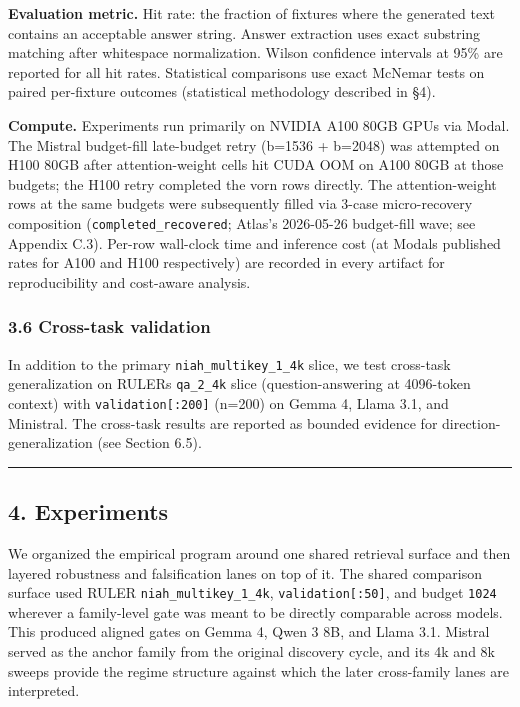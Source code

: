 \documentclass[
]{article}
\begin{document}
\textbf{Evaluation metric.} Hit rate: the fraction of fixtures where the
generated text contains an acceptable answer string. Answer extraction
uses exact substring matching after whitespace normalization. Wilson
confidence intervals at 95\% are reported for all hit rates. Statistical
comparisons use exact McNemar tests on paired per-fixture outcomes
(statistical methodology described in §4).

\textbf{Compute.} Experiments run primarily on NVIDIA A100 80GB GPUs via
Modal. The Mistral budget-fill late-budget retry (b=1536 +
b=2048) was attempted on H100 80GB after attention-weight cells hit CUDA
OOM on A100 80GB at those budgets; the H100 retry completed the vorn
rows directly. The attention-weight rows at the same budgets were
subsequently filled via 3-case micro-recovery composition
(\texttt{completed\_recovered}; Atlas's 2026-05-26 budget-fill wave;
see Appendix C.3). Per-row wall-clock
time and inference cost (at Modal\textquotesingle s published rates for
A100 and H100 respectively) are recorded in every artifact for
reproducibility and cost-aware analysis.

\subsubsection{3.6 Cross-task
validation}\label{36-cross-task-validation}

In addition to the primary \texttt{niah\_multikey\_1\_4k} slice, we test
cross-task generalization on RULER\textquotesingle s \texttt{qa\_2\_4k}
slice (question-answering at 4096-token context) with
\texttt{validation{[}:200{]}} (n=200) on Gemma 4, Llama 3.1, and
Ministral. The cross-task results are reported as bounded evidence
for direction-generalization (see Section 6.5).

\begin{center}\rule{0.5\linewidth}{0.5pt}\end{center}

\subsection{4. Experiments}\label{4-experiments}

We organized the empirical program around one shared retrieval surface
and then layered robustness and falsification lanes on top of it. The
shared comparison surface used RULER \texttt{niah\_multikey\_1\_4k},
\texttt{validation{[}:50{]}}, and budget \texttt{1024} wherever a
family-level gate was meant to be directly comparable across models.
This produced aligned gates on Gemma 4, Qwen 3 8B, and Llama 3.1.
Mistral served as the anchor family from the original
discovery cycle, and its 4k and 8k sweeps provide the regime structure
against which the later cross-family lanes are interpreted.
\end{document}
